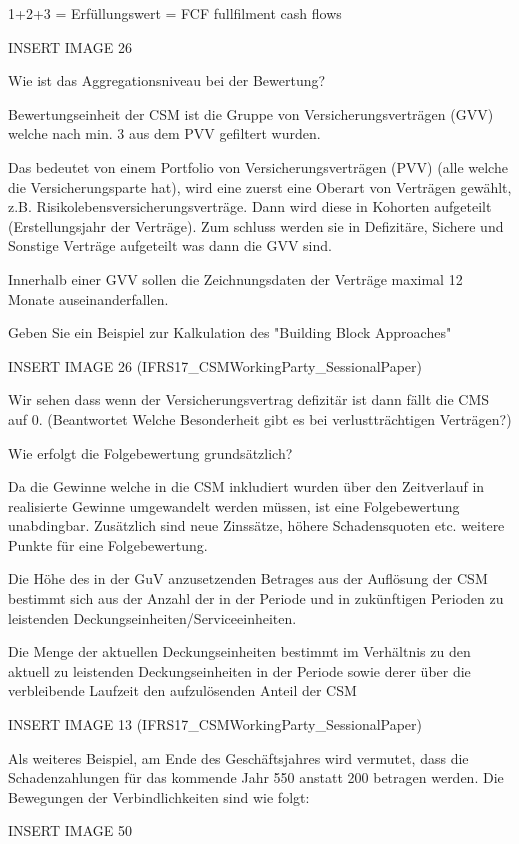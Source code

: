 1+2+3 = Erfüllungswert = FCF fullfilment cash flows

INSERT IMAGE 26

Wie ist das Aggregationsniveau bei der Bewertung?

Bewertungseinheit der CSM ist die Gruppe von Versicherungsverträgen (GVV) welche nach min. 3
aus dem PVV gefiltert wurden.

Das bedeutet von einem Portfolio von Versicherungsverträgen (PVV) (alle welche die Versicherungsparte hat),
wird eine zuerst eine Oberart von Verträgen gewählt, z.B. Risikolebensversicherungsverträge.
Dann wird diese in Kohorten aufgeteilt (Erstellungsjahr der Verträge).
Zum schluss werden sie in Defizitäre, Sichere und Sonstige Verträge aufgeteilt was dann die GVV sind.

Innerhalb einer GVV sollen die Zeichnungsdaten
der Verträge maximal 12 Monate
auseinanderfallen.

Geben Sie ein Beispiel zur Kalkulation des "Building Block Approaches"


INSERT IMAGE 26 (IFRS17_CSMWorkingParty_SessionalPaper)

Wir sehen dass wenn der Versicherungsvertrag defizitär ist dann fällt die CMS auf 0.
(Beantwortet Welche Besonderheit gibt es bei verlustträchtigen Verträgen?)


Wie erfolgt die Folgebewertung grundsätzlich?

Da die Gewinne welche in die CSM inkludiert wurden über den Zeitverlauf in realisierte Gewinne umgewandelt
werden müssen, ist eine Folgebewertung unabdingbar. Zusätzlich sind neue Zinssätze, höhere Schadensquoten etc.
weitere Punkte für eine Folgebewertung.

Die Höhe des in der GuV anzusetzenden Betrages aus der Auflösung der CSM bestimmt sich aus der Anzahl der in der Periode
und in zukünftigen Perioden zu leistenden Deckungseinheiten/Serviceeinheiten.

Die Menge der aktuellen Deckungseinheiten bestimmt im Verhältnis zu den aktuell zu leistenden Deckungseinheiten in der
Periode sowie derer über die verbleibende Laufzeit den aufzulösenden Anteil der CSM

INSERT IMAGE 13 (IFRS17_CSMWorkingParty_SessionalPaper)


Als weiteres Beispiel, am Ende des Geschäftsjahres wird vermutet, dass die Schadenzahlungen für das kommende Jahr 550 anstatt 200 betragen werden. Die
Bewegungen der Verbindlichkeiten sind wie folgt:

INSERT IMAGE 50



